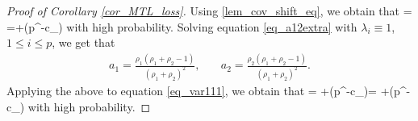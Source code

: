 \begin{proof}[Proof of Corollary \ref{cor_MTL_loss}]
Using \eqref{lem_cov_shift_eq}, we obtain that
\be\label{eq_var111} = \tr{}=+\OO(p^{-c_\varphi})\ee
with high probability. Solving equation \eqref{eq_a12extra} with $\lambda_i\equiv 1$, $1\le i\le p$, we get that  
	\begin{align}
		 a_1 = \frac{\rho_1(\rho_1 + \rho_2 - 1)}{(\rho_1 + \rho_2)^2} ,\quad
		& a_2 = \frac{\rho_2(\rho_1 + \rho_2 - 1)}{(\rho_1 + \rho_2)^2} . \label{simplesovlea12}
			\end{align}
Applying the above to equation \eqref{eq_var111}, we obtain that
\be\label{eq_var112}  =  \cdot {}+\OO(p^{-c_\varphi})=  +\OO(p^{-c_\varphi})\ee
with high probability. 


\end{proof}
